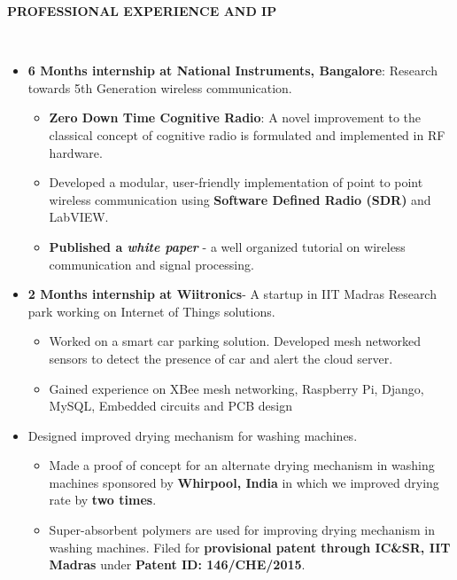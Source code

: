 \documentclass[a4paper,10pt]{article}
\newcommand{\lsep}{-0.5cm}
\newcommand{\resheading}[1]{{\small \colorbox{mygrey}{\begin{minipage}{0.975\textwidth}{\textbf{#1 \vphantom{p\^{E}}}}\end{minipage}}}}
\begin{document}
\resheading{\textbf{PROFESSIONAL EXPERIENCE AND IP} }\\[\lsep]
    \begin{itemize}
            \item \textbf{6 Months internship at National Instruments, Bangalore}: Research towards 5th Generation wireless communication.
        \begin{itemize}
            \vspace{-5pt}
            \item \textbf{Zero Down Time Cognitive Radio}: A novel improvement to the classical concept of cognitive radio is formulated and implemented in RF hardware.
            \item Developed a modular, user-friendly implementation of point to point wireless communication using \textbf{Software Defined Radio (SDR)} and LabVIEW.
            \item \textbf{Published a \textit{white paper}} - a well organized tutorial on wireless communication and signal processing.
        \end{itemize}
        \vspace{-5pt}
        \item \textbf{2 Months internship at Wiitronics}- A startup in IIT Madras Research park working on Internet of Things solutions.
        \vspace{-5pt}
        \begin{itemize}
            \setlength{\itemsep}{1pt}
            \item Worked on a smart car parking solution. Developed mesh networked sensors to detect the presence of car and alert the cloud server.
            \item Gained experience on XBee mesh networking, Raspberry Pi, Django, MySQL, Embedded circuits and PCB design
        \end{itemize}
        \vspace{-5pt}
        \item Designed improved drying mechanism for washing machines.
        \begin{itemize}
            \vspace{-5pt}
            \item Made a proof of concept for an alternate drying mechanism in washing machines sponsored by \textbf{Whirpool, India} in which we improved drying rate by \textbf{two times}.
            \item Super-absorbent polymers are used for improving drying mechanism in washing machines. Filed for \textbf{provisional patent through IC\&SR, IIT Madras} under \textbf{Patent ID: 146/CHE/2015}.
        \end{itemize} 
    \end{itemize}
\end{document}
